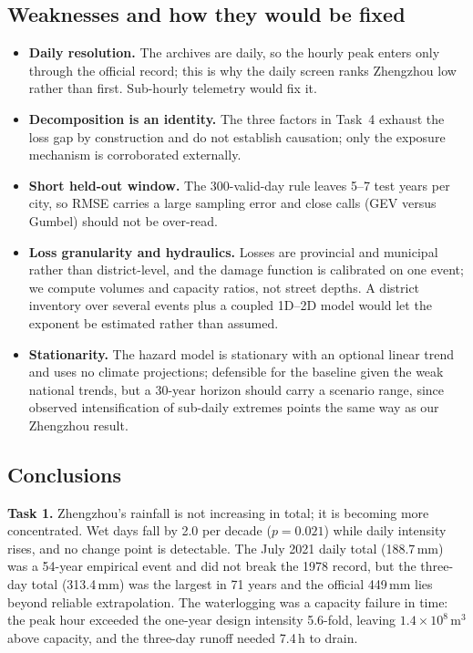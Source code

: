\subsection{Weaknesses and how they would be fixed}

{\small
\begin{itemize}[leftmargin=1.4em,itemsep=1pt,topsep=2pt]
\item \textbf{Daily resolution.} The archives are daily, so the hourly peak enters only through the official record; this is why the daily screen ranks Zhengzhou low rather than first. Sub-hourly telemetry would fix it.
\item \textbf{Decomposition is an identity.} The three factors in Task~4 exhaust the loss gap by construction and do not establish causation; only the exposure mechanism is corroborated externally.
\item \textbf{Short held-out window.} The 300-valid-day rule leaves 5--7 test years per city, so RMSE carries a large sampling error and close calls (GEV versus Gumbel) should not be over-read.
\item \textbf{Loss granularity and hydraulics.} Losses are provincial and municipal rather than district-level, and the damage function is calibrated on one event; we compute volumes and capacity ratios, not street depths. A district inventory over several events plus a coupled 1D--2D model would let the exponent be estimated rather than assumed.
\item \textbf{Stationarity.} The hazard model is stationary with an optional linear trend and uses no climate projections; defensible for the baseline given the weak national trends, but a 30-year horizon should carry a scenario range, since observed intensification of sub-daily extremes \cite{ipcc2021} points the same way as our Zhengzhou result.
\end{itemize}}

\subsection{Conclusions}

\textbf{Task 1.} Zhengzhou's rainfall is not increasing in total; it is becoming more concentrated. Wet days fall by 2.0 per decade ($p=0.021$) while daily intensity rises, and no change point is detectable. The July 2021 daily total (188.7\,mm) was a 54-year empirical event and did not break the 1978 record, but the three-day total (313.4\,mm) was the largest in 71 years and the official 449\,mm lies beyond reliable extrapolation. The waterlogging was a capacity failure in time: the peak hour exceeded the one-year design intensity 5.6-fold, leaving $1.4\times10^{8}$\,m$^3$ above capacity, and the three-day runoff needed 7.4\,h to drain.


